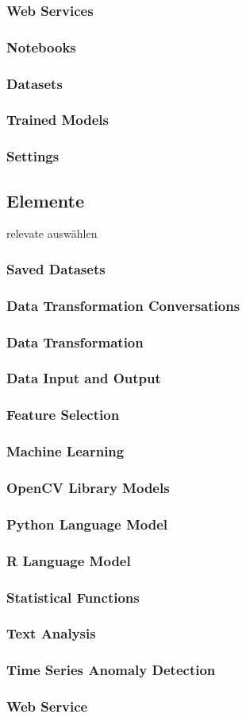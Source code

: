 \subsubsection{Web Services}
\subsubsection{Notebooks}
\subsubsection{Datasets}
\subsubsection{Trained Models}
\subsubsection{Settings}
\subsection{Elemente}
relevate auswählen
\subsubsection{Saved Datasets}
\subsubsection{Data Transformation Conversations}
\subsubsection{Data Transformation}
\subsubsection{Data Input and Output}
\subsubsection{Feature Selection}
\subsubsection{Machine Learning}
\subsubsection{OpenCV Library Models}
\subsubsection{Python Language Model}
\subsubsection{R Language Model}
\subsubsection{Statistical Functions}
\subsubsection{Text Analysis}
\subsubsection{Time Series Anomaly Detection}
\subsubsection{Web Service}
